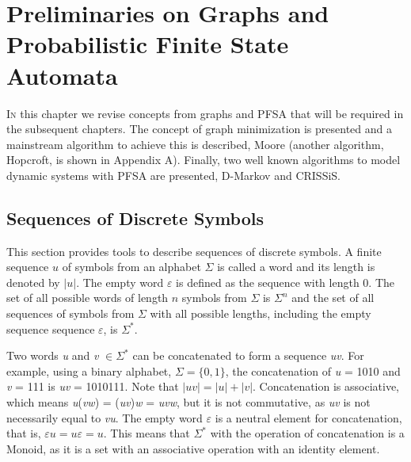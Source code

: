 \chapter{Preliminaries on Graphs and Probabilistic Finite State Automata}\label{cap:2}


{\lettrine[loversize=0.25,findent=0.2em,nindent=0em]{I}{n} this chapter we revise concepts from graphs and PFSA \cite{brianmarcus}\cite{vidal.05} that will be required in the subsequent chapters. The concept of graph minimization is presented and a mainstream algorithm to achieve this is described, Moore (another algorithm, Hopcroft, is shown in Appendix A). Finally, two well known algorithms to model dynamic systems with PFSA are presented, D-Markov and CRISSiS.

\section{Sequences of Discrete Symbols}
This section provides tools to describe sequences of discrete symbols. A finite sequence $u$ of symbols from an alphabet $\Sigma$ is called a word and its length is denoted by $|\textit{u}|$. The empty word $\varepsilon$ is defined as the sequence with length 0. The set of all possible words of length $n$ symbols from $\Sigma$ is $\Sigma^n$ and the set of all sequences of symbols from $\Sigma$ with all possible lengths, including the empty sequence sequence $\varepsilon$, is $\Sigma^*$. 

Two words \textit{u} and \textit{v} $\in \Sigma^*$ can be concatenated to form a sequence \textit{uv}. For example, using a binary alphabet, $\Sigma = \{0,1\}$, the concatenation of \textit{u} = 1010 and \textit{v} = 111 is \textit{uv} = 1010111. Note that $|\textit{uv}| = |\textit{u}| + |\textit{v}|$. Concatenation is associative, which means \textit{u}(\textit{vw}) = (\textit{uv})\textit{w} = \textit{uvw}, but it is not commutative, as \textit{uv} is not necessarily equal to \textit{vu}. The empty word $\varepsilon$ is a neutral element for concatenation, that is, $\varepsilon u = u\varepsilon = u$. This means that $\Sigma^*$ with the operation of concatenation is a Monoid, as it is a set with an associative operation with an identity element.

}

